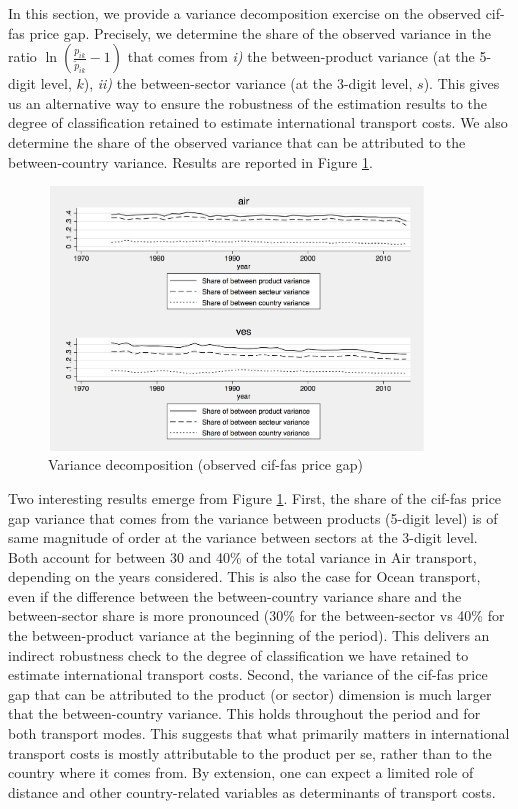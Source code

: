 \documentclass[a4paper,11pt]{article}
\begin{document}
In this section, we provide a variance decomposition exercise on the observed cif-fas price gap. Precisely, we determine the share of the observed variance in the ratio $\ln(\frac{p_{ik}}{\widetilde{p}_{ik}}-1)$ that comes from \textit{i)} the between-product variance (at the 5-digit level, $k$), \textit{ii)} the between-sector variance (at the 3-digit level, $s$). This gives us an alternative way to ensure the robustness of the estimation results to the degree of classification retained to estimate international transport costs. We also determine the share of the observed variance that can be attributed to the between-country variance. Results are reported in Figure \ref{fig:decomp_variance}.

\begin{figure}[htbp]
\caption{Variance decomposition (observed cif-fas price gap)}
\label{fig:decomp_variance}
\begin{center}
\includegraphics[width=10cm, height=7cm]{variance_decomposition.pdf}
\end{center}
\end{figure}

Two interesting results emerge from Figure \ref{fig:decomp_variance}. First, the share of the cif-fas price gap variance that comes from the variance between products (5-digit level) is of same magnitude of order at the variance between sectors at the 3-digit level. Both account for between 30 and 40\% of the total variance in Air transport, depending on the years considered. This is also the case for Ocean transport, even if the difference between the between-country variance share and the between-sector share is more pronounced (30\% for the between-sector vs 40\% for the between-product variance at the beginning of the period). This delivers an indirect robustness check to the degree of classification we have retained to estimate international transport costs. Second, the variance of the cif-fas price gap that can be attributed to the product (or sector) dimension is much larger that the between-country variance. This holds throughout the period and for both transport modes. This suggests that what primarily matters in international transport costs is mostly attributable to the product per se, rather than to the country where it comes from. By extension, one can expect a limited role of distance and other country-related variables as determinants of transport costs.
\end{document}
